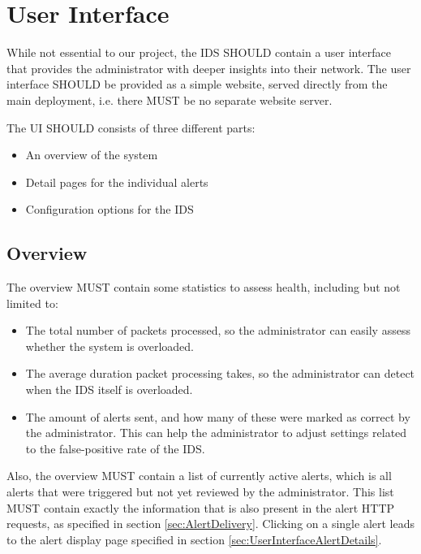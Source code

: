 \documentclass[oneside, english]{reports/assets/sdqtechreport}
\begin{document}
\chapter{User Interface}
\label{chap:UserInterface}

While not essential to our project, the IDS SHOULD contain a user interface
that provides the administrator with deeper insights into their network. The
user interface SHOULD be provided as a simple website, served directly from the
main deployment, i.e. there MUST be no separate website server.

The UI SHOULD consists of three different parts:
\begin{itemize}
	\item An overview of the system
	\item Detail pages for the individual alerts
	\item Configuration options for the IDS
\end{itemize}

\section{Overview}
\label{sec:UserInterfaceOverview}

The overview MUST contain some statistics to assess health, including but not
limited to:

\begin{itemize}
	\item The total number of packets processed, so the administrator can easily assess
	      whether the system is overloaded.
	\item The average duration packet processing takes, so the administrator can detect
	      when the IDS itself is overloaded.
	\item The amount of alerts sent, and how many of these were marked as correct by the
	      administrator. This can help the administrator to adjust settings related to
	      the false-positive rate of the IDS.
\end{itemize}

Also, the overview MUST contain a list of currently active alerts, which is all
alerts that were triggered but not yet reviewed by the administrator. This list
MUST contain exactly the information that is also present in the alert HTTP
requests, as specified in section \ref{sec:AlertDelivery}. Clicking on a single
alert leads to the alert display page specified in section
\ref{sec:UserInterfaceAlertDetails}.
\end{document}
